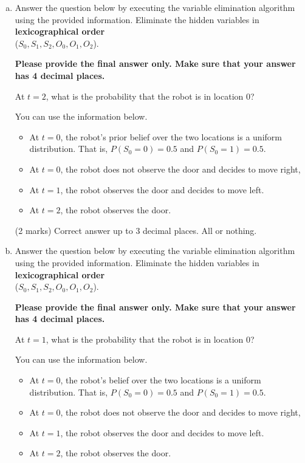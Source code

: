 \documentclass[12pt]{article}
\begin{document}
\begin{enumerate}[(a)]
\item 
\label{q1_filtering}
Answer the question below by executing the variable elimination algorithm using the provided information. 
Eliminate the hidden variables in {\bf lexicographical order} \\
($S_0, S_1, S_2, O_0, O_1, O_2$). 

{\bf Please provide the final answer only. Make sure that your answer has 4 decimal places.}

\begin{problem}
At $t=2$, what is the probability that the robot is in location $0$? 

You can use the information below.
\begin{itemize}
    \item At $t=0$, the robot's prior belief over the two locations is a uniform distribution. That is, $P(S_0 = 0) = 0.5$ and $P(S_0 = 1) = 0.5$.
    \item At $t=0$, the robot does not observe the door and decides to move right, 
    \item At $t=1$, the robot observes the door and decides to move left.
    \item At $t=2$, the robot observes the door.
\end{itemize}

\end{problem}



\begin{markscheme}
(2 marks) Correct answer up to 3 decimal places. All or nothing.

\end{markscheme}


\item
\label{q1_smoothing}
Answer the question below by executing the variable elimination algorithm using the provided information. 
Eliminate the hidden variables in {\bf lexicographical order} \\
($S_0, S_1, S_2, O_0, O_1, O_2$). 

{\bf Please provide the final answer only. Make sure that your answer has 4 decimal places.}

\begin{problem}
At $t=1$, what is the probability that the robot is in location $0$? 

You can use the information below.
\begin{itemize}
    \item At $t=0$, the robot's belief over the two locations is a uniform distribution. That is, $P(S_0 = 0) = 0.5$ and $P(S_0 = 1) = 0.5$.
    \item At $t=0$, the robot does not observe the door and decides to move right, 
    \item At $t=1$, the robot observes the door and decides to move left.
    \item At $t=2$, the robot observes the door.
\end{itemize}


\end{problem}
\end{enumerate}
\end{document}
